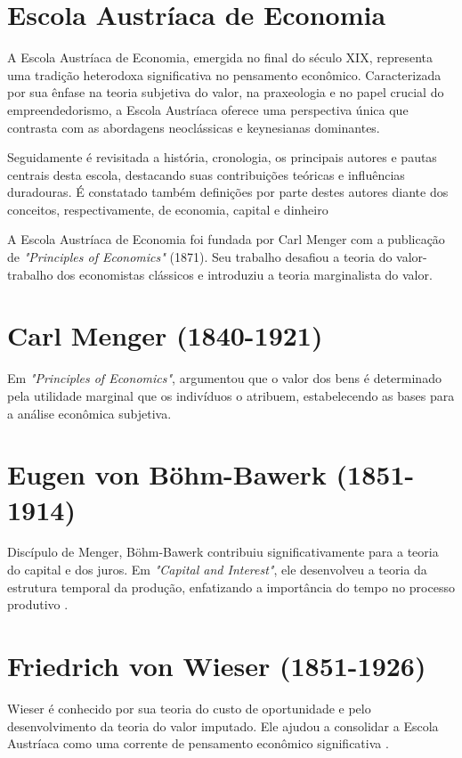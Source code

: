 \clearpage
\section{Escola Austríaca de Economia} \label{sec:austriaca}
A Escola Austríaca de Economia, emergida no final do século XIX, representa uma tradição heterodoxa significativa no pensamento econômico. Caracterizada por sua ênfase na teoria subjetiva do valor, na praxeologia e no papel crucial do empreendedorismo, a Escola Austríaca oferece uma perspectiva única que contrasta com as abordagens neoclássicas e keynesianas dominantes.

Seguidamente é revisitada a história, cronologia, os principais autores e pautas centrais desta escola, destacando suas contribuições teóricas e influências duradouras. É constatado também definições por parte destes autores diante dos conceitos, respectivamente, de economia, capital e dinheiro


A Escola Austríaca de Economia foi fundada por Carl Menger com a publicação de \textit{"Principles of Economics"} (1871). Seu trabalho desafiou a teoria do valor-trabalho dos economistas clássicos e introduziu a teoria marginalista do valor.

\section*{Carl Menger (1840-1921)}
Em \textit{"Principles of Economics"}, \cite{menger1871principles} argumentou que o valor dos bens é determinado pela utilidade marginal que os indivíduos o atribuem, estabelecendo as bases para a análise econômica subjetiva.

\section*{Eugen von Böhm-Bawerk (1851-1914)}
Discípulo de Menger, Böhm-Bawerk contribuiu significativamente para a teoria do capital e dos juros. Em \textit{"Capital and Interest"}, ele desenvolveu a teoria da estrutura temporal da produção, enfatizando a importância do tempo no processo produtivo \cite{bohm1884capital}.

\section*{Friedrich von Wieser (1851-1926)}
Wieser é conhecido por sua teoria do custo de oportunidade e pelo desenvolvimento da teoria do valor imputado. Ele ajudou a consolidar a Escola Austríaca como uma corrente de pensamento econômico significativa \cite{bohm1884capital}.

